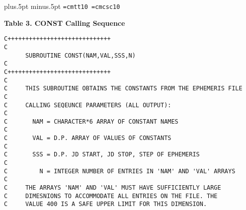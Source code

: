 \newpage                                               %


\parindent=0pt\parskip=8pt
 plus.5pt minus.5pt
\lineskiplimit=1pt\lineskip=1pt
\font\tt=cmtt10
\font\csc=cmcsc10
\newcount\inum
\def\vp{\vskip\parskip}
\def\pf{\par\filbreak}
\def\el{\hfill\break}
\def\itm#1{\leavevmode\hangindent.75truein\hangafter=1
\advance\inum by 1
\hbox to2em{\rm\hfil\number\inum. }#1\vadjust{\kern5pt}\el}
\def\ul#1{$\underline{\hbox{\sl\strut#1}}$}
\def\hdg#1{\vskip4pt\leavevmode\kern-1em \ul{#1}\par}
\centerline{\bf Table 3. CONST Calling Sequence}
\vskip8pt
\begin{verbatim}
C+++++++++++++++++++++++++++++
C
      SUBROUTINE CONST(NAM,VAL,SSS,N)
C
C+++++++++++++++++++++++++++++
C
C     THIS SUBROUTINE OBTAINS THE CONSTANTS FROM THE EPHEMERIS FILE
C
C     CALLING SEQEUNCE PARAMETERS (ALL OUTPUT):
C
C       NAM = CHARACTER*6 ARRAY OF CONSTANT NAMES
C
C       VAL = D.P. ARRAY OF VALUES OF CONSTANTS
C
C       SSS = D.P. JD START, JD STOP, STEP OF EPHEMERIS
C
C         N = INTEGER NUMBER OF ENTRIES IN 'NAM' AND 'VAL' ARRAYS
C
C     THE ARRAYS 'NAM' AND 'VAL' MUST HAVE SUFFICIENTLY LARGE
C     DIMESNIONS TO ACCOMMODATE ALL ENTRIES ON THE FILE. THE
C     VALUE 400 IS A SAFE UPPER LIMIT FOR THIS DIMENSION.
\end{verbatim}

\newpage                                               %

